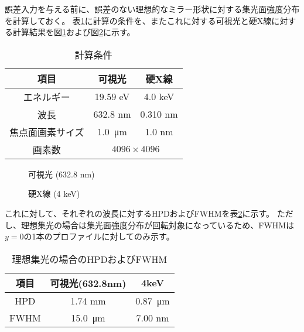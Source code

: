 誤差入力を与える前に、誤差のない理想的なミラー形状に対する集光面強度分布を計算しておく。
表\ref{tb:ideal_simulation_params}に計算の条件を、またこれに対する可視光と硬X線に対する計算結果を図\ref{fig:ideal_simulation_visible}および図\ref{fig:ideal_simulation_xray}に示す。

\begin{table}[!ht]
\begin{center}
  \caption[]{計算条件}
  \begin{tabular}{|c c c|} \hline
    項目 & 可視光 & 硬X線 \\ \hline
    エネルギー & 19.59 eV & 4.0 keV \\
    波長 & 632.8 nm & 0.310 nm \\
    焦点面画素サイズ & \SI{1.0}{\micro \metre} & 1.0 nm \\
    画素数 & \multicolumn{2}{c|}{$4096 \times 4096$} \\\hline
  \end{tabular}
  \label{tb:ideal_simulation_params}
\end{center}
\end{table}

\begin{figure}[!ht]
\centering
{}
\caption[]{可視光 (632.8 nm)}
\label{fig:ideal_simulation_visible}
\end{figure}

\begin{figure}[!ht]
\centering
{}
\caption[]{硬X線 (4 keV)}
\label{fig:ideal_simulation_xray}
\end{figure}


これに対して、それぞれの波長に対するHPDおよびFWHMを表\ref{tb:ideal_focus_evaluation}に示す。
ただし、理想集光の場合は集光面強度分布が回転対象になっているため、FWHMは$y=0$の1本のプロファイルに対してのみ示す。

\begin{table}[!ht]
\begin{center}
  \caption{理想集光の場合のHPDおよびFWHM}
  \begin{tabular}{|c|c|c|} \hline
    項目 & 可視光(632.8nm) & 4keV \\ \hline
    HPD & 1.74 mm & \SI{0.87}{\micro \metre} \\
    FWHM & \SI{15.0}{\micro \metre} & 7.00 nm \\ \hline
  \end{tabular}
  \label{tb:ideal_focus_evaluation}
\end{center}
\end{table}

